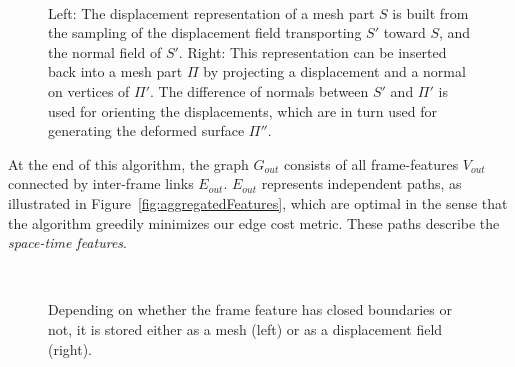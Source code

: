 \documentclass[review]{acmsiggraph}
\begin{document}
\begin{figure}[t!]
    \centering
    \subfigure[Copying]{\label{fig:displacement:copy}
    \resizebox{0.48\linewidth}{!}{}}
    ~~~~
    \subfigure[Pasting]{\label{fig:displacement:insertion}
    \resizebox{0.48\linewidth}{!}{}}
    \caption{
    Left: The displacement representation of a mesh part $S$ is built from the sampling of the displacement field transporting $S'$ toward $S$, and the normal field of $S'$.
    Right: This representation can be inserted back into a mesh part $\Pi$ by projecting a displacement and a normal on vertices of $\Pi'$. 
    The difference of normals between $S'$ and $\Pi'$ is used for orienting the displacements, which are in turn used for generating the deformed surface $\Pi''$.
    }
    \label{fig:displacement}
\end{figure}

At the end
of this algorithm, the graph $G_{out}$ consists of all frame-features $V_{out}$ connected by inter-frame links $E_{out}$.
$E_{out}$ represents independent paths, as illustrated in Figure~\ref{fig:aggregatedFeatures}, which are optimal in the sense that the algorithm greedily minimizes our edge cost metric. 
These paths describe the \emph{space-time features}. 

\begin{figure}[t]
\centering
\label{fig:featureRepresentation}
~
\caption{
Depending on whether the frame feature has closed boundaries or not, it is stored either as a mesh (left) or as a displacement field (right).}
\label{fig:feature_representation}
\end{figure}
\end{document}
